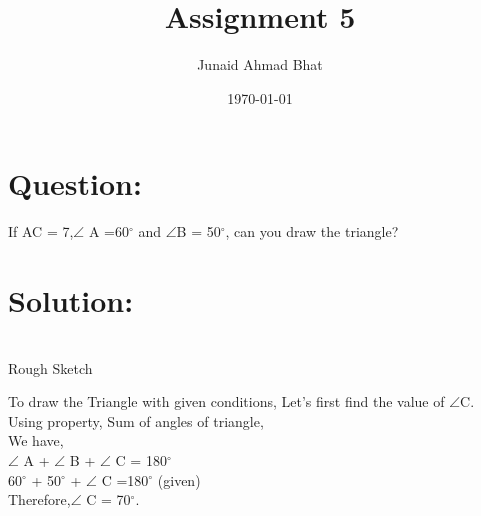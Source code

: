 \documentclass[a4paper,12pt]{article}
\begin{document}
\title{Assignment 5}
\author{Junaid Ahmad Bhat}
\date{\today}
\maketitle
\section*{\small Question:}
If AC = 7,$\angle$  A =60$^{\circ}$ and $\angle$B = 50$^{\circ}$, can you draw the triangle?
\section*{\small Solution:}
\begin{center}

\\
\hspace*{2cm}Rough Sketch\\
\end{center}

\vspace*{1cm}

To draw the Triangle with given conditions,
Let's first find the value of $\angle$C.\\

Using property, Sum of angles of triangle,\\
 
We have,\\

$\angle$ A + $\angle$ B + $\angle$ C = 180$^{\circ}$\\

60$^{\circ}$ + 50$^{\circ}$ + $\angle$ C =180$^{\circ}$  \hspace*{2cm} (given)\\

Therefore,$\angle$ C = 70$^{\circ}$.\\
\end{document}
